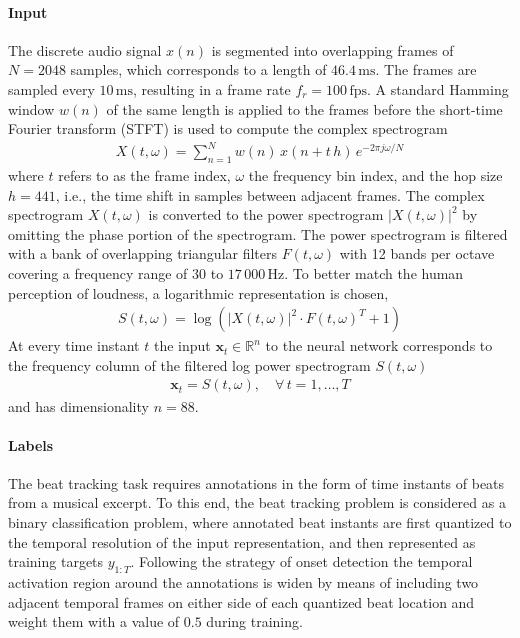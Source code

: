 \documentclass{scrartcl}
\begin{document}
\paragraph{Input}

The discrete audio signal $x(n)$ is segmented into overlapping frames of $N = 2048$ samples, which corresponds to a length of $46.4 \,\text{ms}$. The frames are sampled every $10 \,\text{ms}$, resulting in a frame rate $f_r = 100 \,\text{fps}$. A standard Hamming window $w(n)$ of the same length is applied to the frames before the short-time Fourier transform (STFT) is used to compute the complex spectrogram 
\begin{align}
X(t,\omega) = \sum_{n = 1}^{N} w(n) \, x(n + t\,h) \, e^{-2 \pi j \omega /N}
\end{align} 
where $t$ refers to as the frame index, $\omega$ the frequency bin index, and the hop size $h=441$, i.e., the time shift in samples between adjacent frames. The complex spectrogram $X(t,\omega)$ is converted to the power spectrogram $|X(t,\omega)|^2$ by omitting the phase portion of the spectrogram. The power spectrogram is filtered with a bank of overlapping triangular filters $F(t,\omega)$ with 12 bands per octave covering a frequency range of $30$ to $17\,000 \, \text{Hz}$. To better match the human perception of loudness, a logarithmic representation is chosen, 
\begin{align}
S(t,\omega) = \log \left( |X(t,\omega)|^2 \cdot F(t,\omega)^T + 1 \right)
\end{align} 
At every time instant $t$ the input  $\mathbf x_t \in \mathbb R^n$ to the neural network corresponds to the frequency column of the filtered log power spectrogram $S(t,\omega)$
\begin{align}
\mathbf x_t = S(t,\omega), \quad \forall\, t= 1,\dots,T
\end{align} 
and has dimensionality $n=88$.


\paragraph{Labels}
The beat tracking task requires annotations in the form of time instants of beats from a musical excerpt. To this end, the beat tracking problem is considered as a binary classification problem, where annotated beat instants are first quantized to the temporal resolution of the input representation, and then represented as training targets $y_{1:T}$. Following the strategy of onset detection \cite{Schluter2014} the temporal activation region around the annotations is widen by means of including two adjacent temporal frames on either side of each quantized beat location and weight them with a value of $0.5$ during training. 
\end{document}
